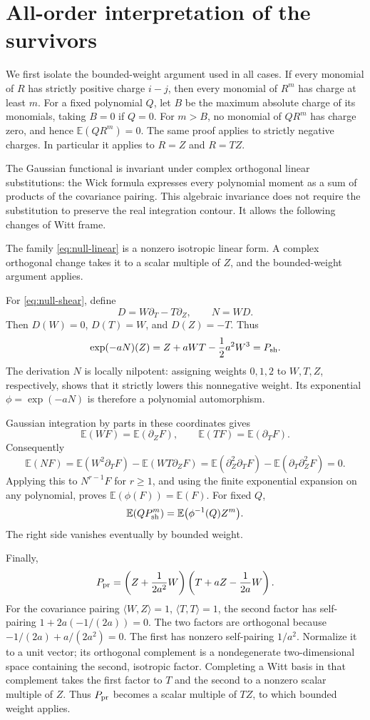 \documentclass[11pt]{article}
\newcommand{\E}{\mathbb E}
\begin{document}
\section{All-order interpretation of the survivors}

We first isolate the bounded-weight argument used in all cases.
If every monomial of \(R\) has strictly positive charge \(i-j\), then
every monomial of \(R^m\) has charge at least \(m\).  For a fixed polynomial
\(Q\), let \(B\) be the maximum absolute charge of its monomials, taking
\(B=0\) if \(Q=0\).  For \(m>B\), no monomial of \(QR^m\) has charge zero,
and hence \(\E(QR^m)=0\).  The same proof applies to strictly negative
charges.  In particular it applies to \(R=Z\) and \(R=TZ\).

The Gaussian functional is invariant under complex orthogonal linear
substitutions: the Wick formula expresses every polynomial moment as a
sum of products of the covariance pairing.  This algebraic invariance
does not require the substitution to preserve the real integration
contour.  It allows the following changes of Witt frame.

The family \eqref{eq:null-linear} is a nonzero isotropic linear form.
A complex orthogonal change takes it to a scalar multiple of \(Z\), and
the bounded-weight argument applies.

For \eqref{eq:null-shear}, define
\[
 D=W\partial_T-T\partial_Z,\qquad N=WD.
\]
Then \(D(W)=0\), \(D(T)=W\), and \(D(Z)=-T\).  Thus
\[
 \exp(-aN)(Z)=Z+aWT-\frac12a^2W^3=P_{\rm sh}.
\]
The derivation \(N\) is locally nilpotent: assigning weights \(0,1,2\) to
\(W,T,Z\), respectively, shows that it strictly lowers this nonnegative
weight.  Its exponential \(\phi=\exp(-aN)\) is therefore a polynomial
automorphism.

Gaussian integration by parts in these coordinates gives
\[
 \E(WF)=\E(\partial_ZF),\qquad
 \E(TF)=\E(\partial_TF).
\]
Consequently
\[
 \E(NF)
 =\E(W^2\partial_TF)-\E(WT\partial_ZF)
 =\E(\partial_Z^2\partial_TF)-\E(\partial_T\partial_Z^2F)=0.
\]
Applying this to \(N^{r-1}F\) for \(r\geq1\), and using the finite
exponential expansion on any polynomial, proves
\(\E(\phi(F))=\E(F)\).  For fixed \(Q\),
\[
 \E(QP_{\rm sh}^m)
 =\E\bigl(\phi^{-1}(Q)Z^m\bigr).
\]
The right side vanishes eventually by bounded weight.

Finally,
\begin{equation}\label{eq:product-factorization}
 P_{\rm pr}
 =
 \left(Z+\frac1{2a^2}W\right)
 \left(T+aZ-\frac1{2a}W\right).
\end{equation}
For the covariance pairing \(\langle W,Z\rangle=1\),
\(\langle T,T\rangle=1\), the second factor has self-pairing
\(1+2a(-1/(2a))=0\).  The two factors are orthogonal because
\(-1/(2a)+a/(2a^2)=0\).  The first has nonzero self-pairing \(1/a^2\).
Normalize it to a unit vector; its orthogonal complement is a
nondegenerate two-dimensional space containing the second, isotropic
factor.  Completing a Witt basis in that complement takes the first
factor to \(T\) and the second to a nonzero scalar multiple of \(Z\).
Thus \(P_{\rm pr}\) becomes a scalar multiple of \(TZ\), to which bounded
weight applies.
\end{document}
